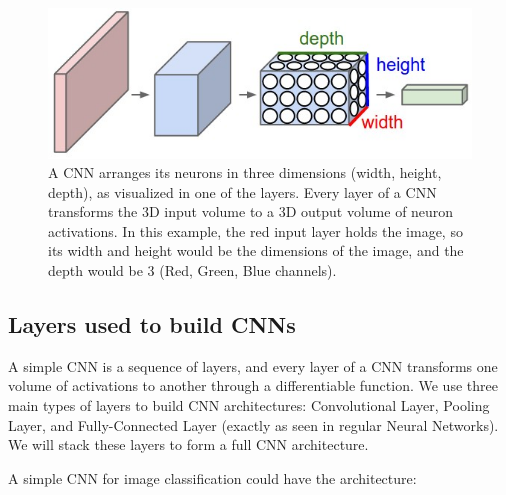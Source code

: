 \documentclass[%
oneside,                 %
final,                   %
10pt]{article}
\begin{document}
\begin{figure}[!ht]  %
  \centerline{\includegraphics[width=0.6\linewidth]{figslides/cnn.jpeg}}
  \caption{
  A CNN arranges its neurons in three dimensions (width, height, depth), as visualized in one of the layers. Every layer of a CNN transforms the 3D input volume to a 3D output volume of neuron activations. In this example, the red input layer holds the image, so its width and height would be the dimensions of the image, and the depth would be 3 (Red, Green, Blue channels).
  }
\end{figure}




\subsection*{Layers used to build CNNs}


A simple CNN is a sequence of layers, and every layer of a CNN
transforms one volume of activations to another through a
differentiable function. We use three main types of layers to build
CNN architectures: Convolutional Layer, Pooling Layer, and
Fully-Connected Layer (exactly as seen in regular Neural Networks). We
will stack these layers to form a full CNN architecture.

A simple CNN for image classification could have the architecture:
\end{document}
